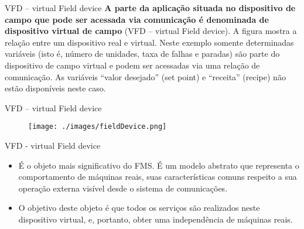 \documentclass{beamer}
\begin{document}
\begin{frame}{VFD – virtual Field device}
\textbf{A parte da aplicação situada no dispositivo de campo que pode ser acessada via comunicação é denominada de dispositivo virtual de campo} (VFD – virtual Field device). A figura mostra a relação entre um dispositivo real e virtual. Neste exemplo somente determinadas variáveis (isto é, número de unidades, taxa de falhas e paradas) são parte do dispositivo de campo virtual e podem ser acessadas via uma relação de comunicação. As variáveis “valor desejado” (set point) e “receita” (recipe) não estão disponíveis neste caso.

\end{frame}

\begin{frame}{VFD – virtual Field device}
\begin{figure}
	\texttt{[image: ./images/fieldDevice.png]}
	\caption*{}
\end{figure}
\end{frame}

\begin{frame}{VFD - virtual Field device}
\begin{itemize}
\item É o objeto mais significativo do FMS. É um modelo abstrato que representa o comportamento de máquinas reais, suas características comuns respeito a sua operação externa visível desde o sistema de comunicações.

\item O objetivo deste objeto é que todos os serviços são realizados neste dispositivo virtual, e, portanto, obter uma independência de máquinas reais.
\end{itemize}
\end{frame}
\end{document}
